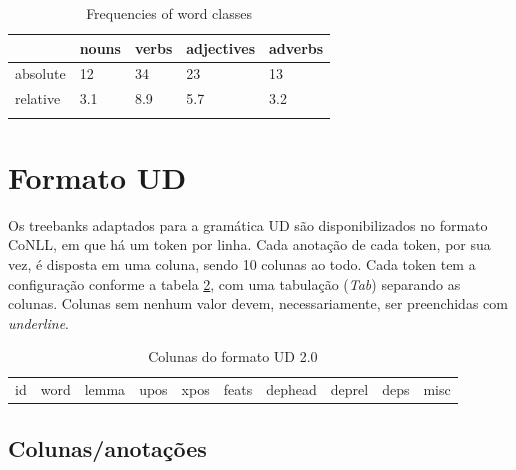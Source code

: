 \documentclass[output=paper,colorlinks,citecolor=brown]{langscibook}
\begin{document}
\begin{table}
\caption{Frequencies of word classes}
\label{tab:1:frequencies}
 \begin{tabular}{lllll} 
  \lsptoprule
            & nouns & verbs & adjectives & adverbs\\ 
  \midrule
  absolute  &   12 &    34  &    23     & 13\\
  relative  &   3.1 &   8.9 &    5.7    & 3.2\\
  \lspbottomrule
 \end{tabular}
\end{table}

\section{Formato UD}\label{sec:formatoud}

Os treebanks adaptados para a gramática UD são disponibilizados no formato CoNLL, em que há um token por linha. Cada anotação de cada token, por sua vez, é disposta em uma coluna, sendo 10 colunas ao todo. Cada token tem a configuração conforme a tabela \ref{tab:colunasUD}, com uma tabulação (\textit{Tab}) separando as colunas. Colunas sem nenhum valor devem, necessariamente, ser preenchidas com \textit{underline}.

\begin{table}[]
    \centering
    \begin{tabular}{c c c c c c c c c c}
         id & word & lemma & upos & xpos & feats & dephead & deprel & deps & misc\\
    \end{tabular}
    \caption{Colunas do formato UD 2.0}
    \label{tab:colunasUD}
\end{table}

\subsection{Colunas/anotações}\label{sec:colunas}
\end{document}
